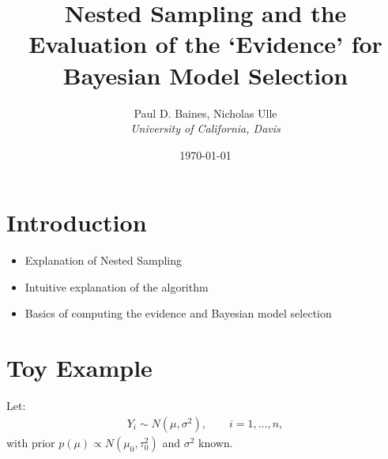 \documentclass[11pt]{article}
\begin{document}
\title{Nested Sampling and the Evaluation of the \lq{}Evidence\rq{} for Bayesian Model Selection}
\author{
Paul D. Baines, Nicholas Ulle\\
\emph{University of California, Davis}
}
\date{\today}
\maketitle

\section{Introduction}\label{overview}

\begin{itemize}
 \item Explanation of Nested Sampling
 \item Intuitive explanation of the algorithm
 \item Basics of computing the evidence and Bayesian model selection
\end{itemize}

\section{Toy Example}
Let:
\begin{align*}
Y_{i} \sim{} N(\mu,\sigma^{2}) , \qquad i=1,\ldots,n ,
\end{align*}
with prior $p(\mu)\propto{}N(\mu_{0},\tau_{0}^{2})$ and $\sigma^{2}$ known. 
\end{document}
